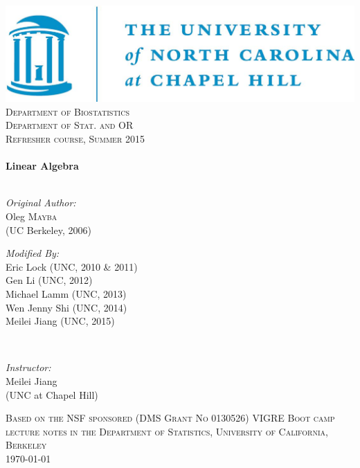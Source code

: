 \begin{titlepage}

\begin{center}


\includegraphics[width=.5\textwidth]{logo}\\[1cm]

\textsc{\LARGE Department of Biostatistics }\\[.25cm]
\textsc{\LARGE Department of Stat. and OR }\\[1.5cm]

\textsc{\Large Refresher course, Summer 2015}\\[0.5cm]


\HRule \\[0.4cm]
{ \huge \bfseries Linear Algebra}\\[0.4cm]

\HRule \\[1.5cm]

\begin{minipage}{0.4\textwidth}
\begin{flushleft} \large
\emph{Original Author:} \\
Oleg \textsc{Mayba}\\(UC Berkeley, 2006) 
\end{flushleft}
\end{minipage}
\begin{minipage}{0.5\textwidth}
\begin{flushright} \large
\emph{Modified By:}\\
Eric Lock (UNC, 2010 \& 2011)\\
Gen Li (UNC, 2012)\\
Michael Lamm (UNC, 2013)\\
Wen Jenny Shi (UNC, 2014)\\
Meilei Jiang (UNC, 2015)
\end{flushright}
\end{minipage}\\
\vspace{30 pt}
\begin{centering}
\large \emph{Instructor:} \\
Meilei Jiang \\ (UNC at Chapel Hill)
\end{centering}

\vfill
\textsc{\Large Based on the NSF sponsored (DMS Grant No 0130526) VIGRE Boot camp lecture notes in the Department of Statistics,  University of California, Berkeley }\\[0.5cm]
{\large \today}

\end{center}

\end{titlepage} 